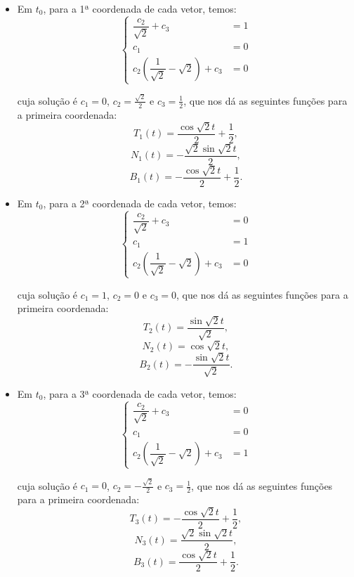 \documentclass{article}
\begin{document}
\begin{itemize}
    \item Em $t_0$, para a 1ª coordenada de cada vetor, temos:
        \begin{equation*}
            \left\{
                \begin{array}{rl}
                    \dfrac{c_2}{\sqrt{2}} + c_3 & = 1 \\
                    c_1 & = 0 \\
                    c_2\left(\dfrac{1}{\sqrt{2}} - \sqrt{2}\right) + c_3 & = 0
                \end{array}
            \right.
        \end{equation*}
        
        cuja solução é $c_1 = 0$, $c_2 = \frac{\sqrt{2}}{2}$ e $c_3 = \frac{1}{2}$, que nos dá as seguintes funções para a primeira coordenada:
        \[T_1(t) = \dfrac{\cos{\sqrt{2}t}}{2} + \dfrac{1}{2},\]
        \[N_1(t) = - \dfrac{\sqrt{2}\sin{\sqrt{2}t}}{2},\]
        \[B_1(t) = - \dfrac{\cos{\sqrt{2}t}}{2} + \dfrac{1}{2}.\]
        
    \item Em $t_0$, para a 2ª coordenada de cada vetor, temos:
        \begin{equation*}
            \left\{
                \begin{array}{rl}
                    \dfrac{c_2}{\sqrt{2}} + c_3 & = 0 \\
                    c_1 & = 1 \\
                    c_2\left(\dfrac{1}{\sqrt{2}} - \sqrt{2}\right) + c_3 & = 0
                \end{array}
            \right.
        \end{equation*}
        
        cuja solução é $c_1 = 1$, $c_2 = 0$ e $c_3 = 0$, que nos dá as seguintes funções para a primeira coordenada:
        \[T_2(t) = \dfrac{\sin{\sqrt{2}t}}{\sqrt{2}},\]
        \[N_2(t) = \cos{\sqrt{2}t},\]
        \[B_2(t) = -\dfrac{\sin{\sqrt{2}t}}{\sqrt{2}}.\]
        
    \item Em $t_0$, para a 3ª coordenada de cada vetor, temos:
        \begin{equation*}
            \left\{
                \begin{array}{rl}
                    \dfrac{c_2}{\sqrt{2}} + c_3 & = 0 \\
                    c_1 & = 0 \\
                    c_2\left(\dfrac{1}{\sqrt{2}} - \sqrt{2}\right) + c_3 & = 1
                \end{array}
            \right.
        \end{equation*}
        
        cuja solução é $c_1 = 0$, $c_2 = -\frac{\sqrt{2}}{2}$ e $c_3 = \frac{1}{2}$, que nos dá as seguintes funções para a primeira coordenada:
        \[T_3(t) = - \dfrac{\cos{\sqrt{2}t}}{2} + \dfrac{1}{2},\]
        \[N_3(t) = \dfrac{\sqrt{2}\sin{\sqrt{2}t}}{2},\]
        \[B_3(t) = \dfrac{\cos{\sqrt{2}t}}{2} + \dfrac{1}{2}.\]
\end{itemize}
\end{document}
